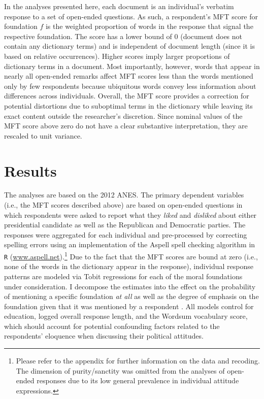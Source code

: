 \documentclass[12pt]{article}
\begin{document}
In the analyses presented here, each document is an individual's verbatim response to a set of open-ended questions. As such, a respondent's MFT score for foundation $f$ is the weighted proportion of words in the response that signal the respective foundation. The score has a lower bound of 0 (document does not contain any dictionary terms) and is independent of document length (since it is based on relative occurrences). Higher scores imply larger proportions of dictionary terms in a document. Most importantly, however, words that appear in nearly all open-ended remarks affect MFT scores less than the words mentioned only by few respondents because ubiquitous words convey less information about differences across individuals. Overall, the MFT score provides a correction for potential distortions due to suboptimal terms in the dictionary while leaving its exact content outside the researcher's discretion. Since nominal values of the MFT score above zero do not have a clear substantive interpretation, they are rescaled to unit variance.


\section*{Results}

The analyses are based on the 2012 ANES. The primary dependent variables (i.e., the MFT scores described above) are based on open-ended questions in which respondents were asked to report what they \textit{liked} and \textit{disliked} about either presidential candidate as well as the Republican and Democratic parties. The responses were aggregated for each individual and pre-processed by correcting spelling errors using an implementation of the Aspell spell checking algorithm in \texttt{R} (\url{www.aspell.net}).\footnote{Please refer to the appendix for further information on the data and recoding. The dimension of purity/sanctity was omitted from the analyses of open-ended responses due to its low general prevalence in individual attitude expressions.} Due to the fact that the MFT scores are bound at zero (i.e., none of the words in the dictionary appear in the response), individual response patterns are modeled via Tobit regressions for each of the moral foundations under consideration. I decompose the estimates into the effect on the probability of mentioning a specific foundation \textit{at all} as well as the degree of emphasis on the foundation given that it was mentioned by a respondent \citep[c.f.][]{mcdonald1980uses}. All models control for education, logged overall response length, and the Wordsum vocabulary score, which should account for potential confounding factors related to the respondents' eloquence when discussing their political attitudes.
\end{document}
